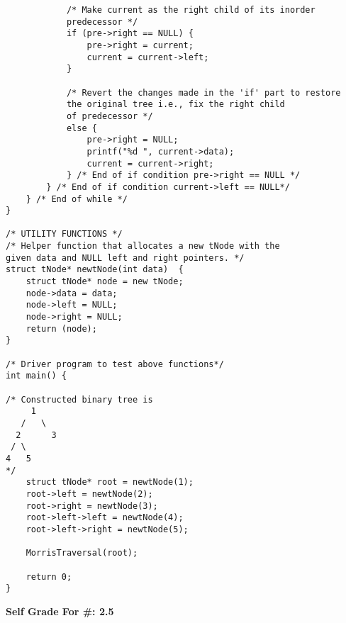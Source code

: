 \documentclass[conference]{IEEEtran}
\begin{document}
\begin{itemize}
\begin{lstlisting}
            /* Make current as the right child of its inorder  
            predecessor */
            if (pre->right == NULL) { 
                pre->right = current; 
                current = current->left; 
            } 

            /* Revert the changes made in the 'if' part to restore  
            the original tree i.e., fix the right child 
            of predecessor */
            else { 
                pre->right = NULL; 
                printf("%d ", current->data); 
                current = current->right; 
            } /* End of if condition pre->right == NULL */
        } /* End of if condition current->left == NULL*/
    } /* End of while */
} 

/* UTILITY FUNCTIONS */
/* Helper function that allocates a new tNode with the 
given data and NULL left and right pointers. */
struct tNode* newtNode(int data)  { 
    struct tNode* node = new tNode; 
    node->data = data; 
    node->left = NULL; 
    node->right = NULL; 
    return (node); 
} 

/* Driver program to test above functions*/
int main() { 

/* Constructed binary tree is 
     1 
   /   \ 
  2      3 
 / \ 
4   5 
*/
    struct tNode* root = newtNode(1); 
    root->left = newtNode(2); 
    root->right = newtNode(3); 
    root->left->left = newtNode(4); 
    root->left->right = newtNode(5); 

    MorrisTraversal(root); 

    return 0; 
} 
\end{lstlisting}
\begin{center}
\textbf{Self Grade For \#: 2.5}
\end{center}
\end{itemize}
\end{document}
